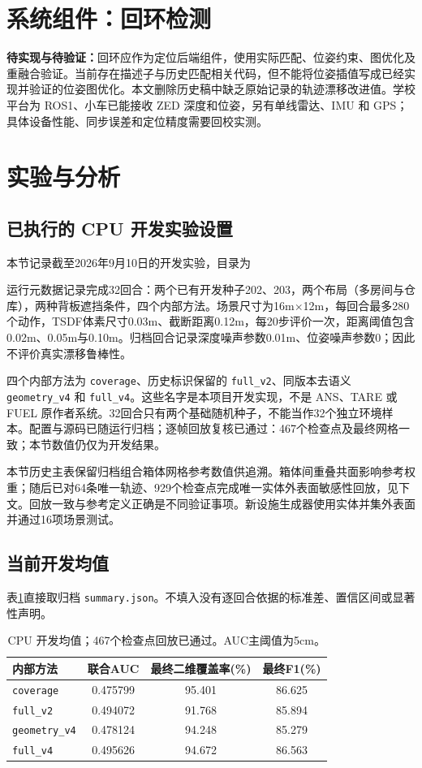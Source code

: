 \documentclass[11pt,a4paper]{article}
\begin{document}
\section{系统组件：回环检测}
\label{sec:loop}
\textbf{待实现与待验证：}回环应作为定位后端组件，使用实际匹配、位姿约束、图优化及重融合验证。当前存在描述子与历史匹配相关代码，但不能将位姿插值写成已经实现并验证的位姿图优化。本文删除历史稿中缺乏原始记录的轨迹漂移改进值。学校平台为 ROS1、小车已能接收 ZED 深度和位姿，另有单线雷达、IMU 和 GPS；具体设备性能、同步误差和定位精度需要回校实测。

\section{实验与分析}
\subsection{已执行的 CPU 开发实验设置}
本节记录截至2026年9月10日的开发实验，目录为
\begin{center}\small{}\end{center}
运行元数据记录完成32回合：两个已有开发种子202、203，两个布局（多房间与仓库），两种背板遮挡条件，四个内部方法。场景尺寸为16m$\times$12m，每回合最多280个动作，TSDF体素尺寸0.03m、截断距离0.12m，每20步评价一次，距离阈值包含0.02m、0.05m与0.10m。归档回合记录深度噪声参数0.01m、位姿噪声参数0；因此不评价真实漂移鲁棒性。

四个内部方法为 \texttt{coverage}、历史标识保留的 \texttt{full\_v2}、同版本去语义 \texttt{geometry\_v4} 和 \texttt{full\_v4}。这些名字是本项目开发实现，不是 ANS、TARE 或 FUEL 原作者系统。32回合只有两个基础随机种子，不能当作32个独立环境样本。配置与源码已随运行归档；逐帧回放复核已通过：467个检查点及最终网格一致；本节数值仍仅为开发结果。

本节历史主表保留归档组合箱体网格参考数值供追溯。箱体间重叠共面影响参考权重；随后已对64条唯一轨迹、929个检查点完成唯一实体外表面敏感性回放，见下文。回放一致与参考定义正确是不同验证事项。新设施生成器使用实体并集外表面并通过16项场景测试。

\subsection{当前开发均值}
表\ref{tab:development}直接取归档 \texttt{summary.json}。不填入没有逐回合依据的标准差、置信区间或显著性声明。
\begin{table}[htbp]
\centering
\caption{CPU 开发均值；467个检查点回放已通过。AUC主阈值为5cm。}
\label{tab:development}
\begin{tabular}{lccc}
\toprule
内部方法 & 联合AUC & 最终二维覆盖率(\%) & 最终F1(\%)\\
\midrule
\texttt{coverage} & 0.475799 & 95.401 & 86.625 \\
\texttt{full\_v2} & 0.494072 & 91.768 & 85.894 \\
\texttt{geometry\_v4} & 0.478124 & 94.248 & 85.279 \\
\texttt{full\_v4} & 0.495626 & 94.672 & 86.563 \\
\bottomrule
\end{tabular}
\end{table}
\end{document}
